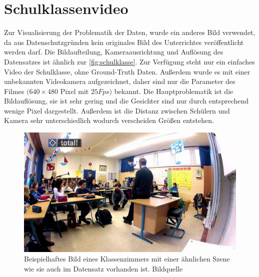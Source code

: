 \section{Schulklassenvideo}
\label{Schulvideo}
Zur Visualisierung der Problematik der Daten, wurde ein anderes Bild verwendet, da aus Datenschutzgründen kein originales Bild des Unterrichtes veröffentlicht werden darf. Die Bildaufteilung, Kameraausrichtung und Auflösung des Datensatzes ist ähnlich zur \autoref{fig:schulklasse}. Zur Verfügung steht nur ein einfaches Video der Schulklasse, ohne Ground-Truth Daten. Außerdem wurde es mit einer unbekannten Videokamera aufgezeichnet, daher sind nur die Parameter des Filmes $(640 \times 480$ Pixel mit $25Fps)$ bekannt.
\newpage
Die Hauptproblematik ist die Bildauflösung, sie ist sehr gering und die Gesichter sind nur durch entsprechend wenige Pixel dargestellt. Außerdem ist die Distanz zwischen Schülern und Kamera sehr unterschiedlich wodurch verscheiden Größen entstehen.\\
\begin{figure}
	\centering
	\includegraphics[width=\linewidth]{img/Schulklasse}
	\caption{Beispielhaftes Bild eines Klassenzimmers mit einer ähnlichen Szene wie sie auch im Datensatz vorhanden ist. Bildquelle \cite{Schulklasse_Video}}
	\label{fig:schulklasse}
\end{figure}
